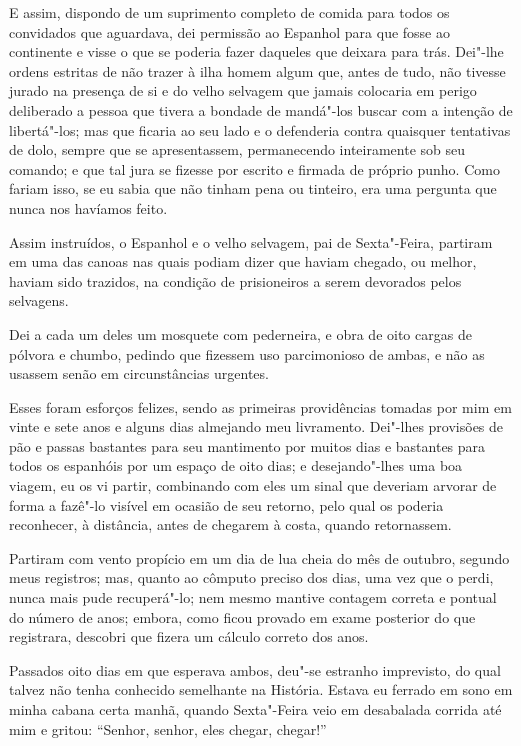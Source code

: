 E assim, dispondo de um suprimento completo de comida para todos os
convidados que aguardava, dei permissão ao Espanhol para que fosse ao
continente e visse o que se poderia fazer daqueles que deixara para
trás. Dei"-lhe ordens estritas de não trazer à ilha homem algum que,
antes de tudo, não tivesse jurado na presença de si e do velho selvagem
que jamais colocaria em perigo deliberado a pessoa que tivera a bondade
de mandá"-los buscar com a intenção de libertá"-los; mas que ficaria ao
seu lado e o defenderia contra quaisquer tentativas de dolo, sempre que
se apresentassem, permanecendo inteiramente sob seu comando; e que tal
jura se fizesse por escrito e firmada de próprio punho. Como fariam
isso, se eu sabia que não tinham pena ou tinteiro, era uma pergunta que
nunca nos havíamos feito.

Assim instruídos, o Espanhol e o velho selvagem, pai de Sexta"-Feira,
partiram em uma das canoas nas quais podiam dizer que haviam chegado, ou
melhor, haviam sido trazidos, na condição de prisioneiros a serem
devorados pelos selvagens.

Dei a cada um deles um mosquete com pederneira, e obra de oito cargas de
pólvora e chumbo, pedindo que fizessem uso parcimonioso de ambas, e não
as usassem senão em circunstâncias urgentes.

Esses foram esforços felizes, sendo as primeiras providências tomadas
por mim em vinte e sete anos e alguns dias almejando meu livramento.
Dei"-lhes provisões de pão e passas bastantes para seu mantimento por
muitos dias e bastantes para todos os espanhóis por um espaço de oito
dias; e desejando"-lhes uma boa viagem, eu os vi partir, combinando com
eles um sinal que deveriam arvorar de forma a fazê"-lo visível em ocasião
de seu retorno, pelo qual os poderia reconhecer, à distância, antes de
chegarem à costa, quando retornassem.

Partiram com vento propício em um dia de lua cheia do mês de outubro,
segundo meus registros; mas, quanto ao cômputo preciso dos dias, uma vez
que o perdi, nunca mais pude recuperá"-lo; nem mesmo mantive contagem
correta e pontual do número de anos; embora, como ficou provado em exame
posterior do que registrara, descobri que fizera um cálculo correto dos
anos.

Passados oito dias em que esperava ambos, deu"-se estranho imprevisto, do
qual talvez não tenha conhecido semelhante na História. Estava eu
ferrado em sono em minha cabana certa manhã, quando Sexta"-Feira veio em
desabalada corrida até mim e gritou: ``Senhor, senhor, eles chegar,
chegar!''

